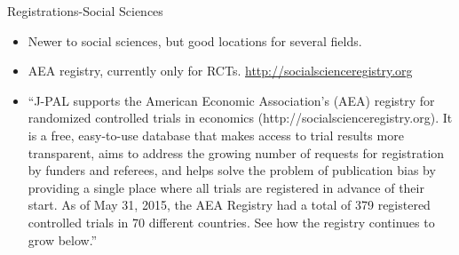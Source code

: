 \documentclass{beamer}
\begin{document}
\begin{frame}[label=regmain]{Registrations-Social Sciences}
\begin{itemize}
   \item Newer to social sciences, but good locations for several fields.
   \item AEA registry, currently only for RCTs. \url{http://socialscienceregistry.org}
   \item
   ``J-PAL supports the American Economic Association's (AEA) registry for randomized controlled trials in economics (http://socialscienceregistry.org). It is a free, easy-to-use database that makes access to trial results more transparent, aims to address the growing number of requests for registration by funders and referees, and helps solve the problem of publication bias by providing a single place where all trials are registered in advance of their start. As of May 31, 2015, the AEA Registry had a total of 379 registered controlled trials in 70 different countries. See how the registry continues to grow below.'' 
 \end{itemize}
 \end{frame}
 { %
    \begin{frame}[plain, label=AEAreg]
     \end{frame}
}
\end{document}
